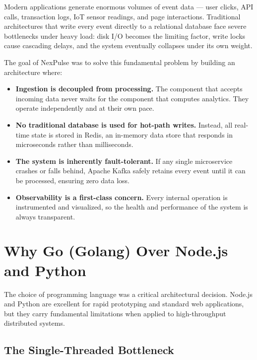 \documentclass[12pt,a4paper]{article}
\begin{document}
Modern applications generate enormous volumes of event data --- user clicks, API calls, transaction logs, IoT sensor readings, and page interactions. Traditional architectures that write every event directly to a relational database face severe bottlenecks under heavy load: disk I/O becomes the limiting factor, write locks cause cascading delays, and the system eventually collapses under its own weight.

The goal of NexPulse was to solve this fundamental problem by building an architecture where:

\begin{itemize}[leftmargin=2em]
    \item \textbf{Ingestion is decoupled from processing.} The component that accepts incoming data never waits for the component that computes analytics. They operate independently and at their own pace.
    \item \textbf{No traditional database is used for hot-path writes.} Instead, all real-time state is stored in Redis, an in-memory data store that responds in microseconds rather than milliseconds.
    \item \textbf{The system is inherently fault-tolerant.} If any single microservice crashes or falls behind, Apache Kafka safely retains every event until it can be processed, ensuring zero data loss.
    \item \textbf{Observability is a first-class concern.} Every internal operation is instrumented and visualized, so the health and performance of the system is always transparent.
\end{itemize}

\section{Why Go (Golang) Over Node.js and Python}

The choice of programming language was a critical architectural decision. Node.js and Python are excellent for rapid prototyping and standard web applications, but they carry fundamental limitations when applied to high-throughput distributed systems.

\subsection{The Single-Threaded Bottleneck}
\end{document}
